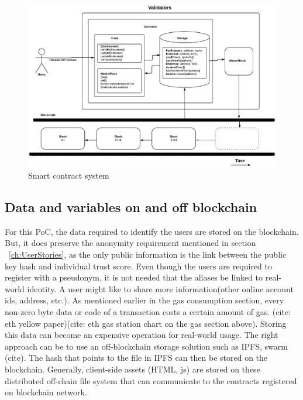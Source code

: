\begin{figure}
	\centering
	\includegraphics[width=1.0\textwidth]{Images/SmartContractsEDSMarketPlace.eps}
	\caption{Smart contract system}
	\label{fig:smartcontracts}
\end{figure}


\subsection{Data and variables on and off blockchain}
For this PoC, the data required to identify the users are stored on the
blockchain. But, it does preserve the anonymity requirement mentioned in
section ~\ref{ch:UserStories}, as the only public information is the link between the public
key hash and individual trust score. Even though the users are required to
register with a pseudonym, it is not needed that the aliases be linked to
real-world identity. A user might like to share more information(other online
account ids, address, etc.).  As mentioned earlier in the gas consumption
section, every non-zero byte data or code of a transaction costs a certain
amount of gas. (cite: eth yellow paper)(cite: eth gas station chart on the gas
section above). Storing this data can become an expensive operation for
real-world usage. The right approach can be to use an off-blockchain storage
solution such as IPFS, swarm (cite). The hash that points to the file in IPFS
can then be stored on the blockchain. Generally, client-side assets (HTML, js)
are stored on these distributed off-chain file system that can communicate to
the contracts registered on blockchain network. 


